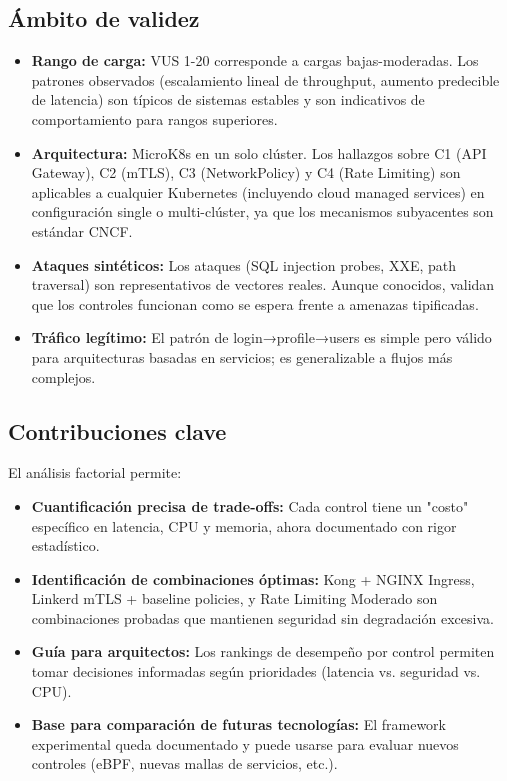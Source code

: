 \subsection{Ámbito de validez}
\begin{itemize}
	\item \textbf{Rango de carga:} VUS 1-20 corresponde a cargas bajas-moderadas. Los patrones observados (escalamiento lineal de throughput, aumento predecible de latencia) son típicos de sistemas estables y son indicativos de comportamiento para rangos superiores.
	\item \textbf{Arquitectura:} MicroK8s en un solo clúster. Los hallazgos sobre C1 (API Gateway), C2 (mTLS), C3 (NetworkPolicy) y C4 (Rate Limiting) son aplicables a cualquier Kubernetes (incluyendo cloud managed services) en configuración single o multi-clúster, ya que los mecanismos subyacentes son estándar CNCF.
	\item \textbf{Ataques sintéticos:} Los ataques (SQL injection probes, XXE, path traversal) son representativos de vectores reales. Aunque conocidos, validan que los controles funcionan como se espera frente a amenazas tipificadas.
	\item \textbf{Tráfico legítimo:} El patrón de login→profile→users es simple pero válido para arquitecturas basadas en servicios; es generalizable a flujos más complejos.
\end{itemize}

\subsection{Contribuciones clave}
El análisis factorial permite:
\begin{itemize}
	\item \textbf{Cuantificación precisa de trade-offs:} Cada control tiene un "costo" específico en latencia, CPU y memoria, ahora documentado con rigor estadístico.
	\item \textbf{Identificación de combinaciones óptimas:} Kong + NGINX Ingress, Linkerd mTLS + baseline policies, y Rate Limiting Moderado son combinaciones probadas que mantienen seguridad sin degradación excesiva.
	\item \textbf{Guía para arquitectos:} Los rankings de desempeño por control permiten tomar decisiones informadas según prioridades (latencia vs. seguridad vs. CPU).
	\item \textbf{Base para comparación de futuras tecnologías:} El framework experimental queda documentado y puede usarse para evaluar nuevos controles (eBPF, nuevas mallas de servicios, etc.).
\end{itemize}

